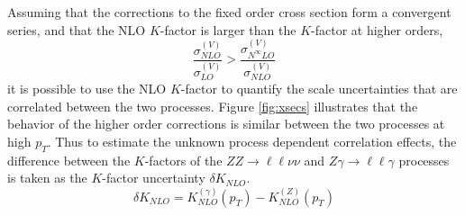 \documentclass[11pt,a4paper,openright,twoside]{report}
\newcommand{\ZZ}{$ZZ\to \ell\ell\nu\nu$ }
\newcommand{\Zg}{$Z\gamma\to \ell\ell\gamma$ }
\begin{document}
Assuming that the corrections to the fixed order cross section form a convergent series, and that the NLO $K$-factor is larger than the $K$-factor at higher orders,
\begin{equation}
\frac{\sigma^{(V)}_{NLO}}{\sigma^{(V)}_{LO}} >\frac{\sigma^{(V)}_{N^{\infty}LO}}{\sigma^{(V)}_{NLO}}
\end{equation}
it is possible to use the NLO $K$-factor to quantify the scale uncertainties that are correlated between the two processes. Figure \ref{fig:xsecs} illustrates that the behavior of the higher order corrections is similar between the two processes at high $p_T$. Thus to estimate the unknown process dependent correlation effects, the difference between the $K$-factors of the \ZZ and \Zg processes is taken as the $K$-factor uncertainty $\delta K_{NLO}$.
\begin{equation}
\delta K_{NLO} = K_{NLO}^{(\gamma)}(p_T) - K_{NLO}^{(Z)}(p_T)
\label{eq:K_factor_unc}
\end{equation}
\end{document}
